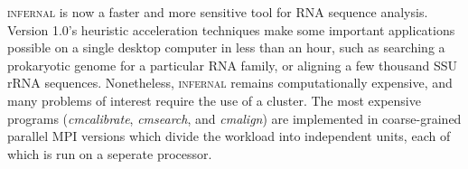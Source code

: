 
\textsc{infernal} is now a faster and more sensitive tool for RNA
sequence analysis.  Version 1.0's heuristic acceleration techniques
make some important applications possible on a single desktop computer
in less than an hour, such as searching a prokaryotic genome for a
particular RNA family, or aligning a few thousand SSU rRNA sequences.
Nonetheless, \textsc{infernal} remains computationally expensive, and many
problems of interest require the use of a cluster.  The most expensive
programs (\emph{cmcalibrate}, \emph{cmsearch}, and \emph{cmalign}) are
implemented in coarse-grained parallel MPI versions which divide the
workload into independent units, each of which is run on a seperate
processor. 
